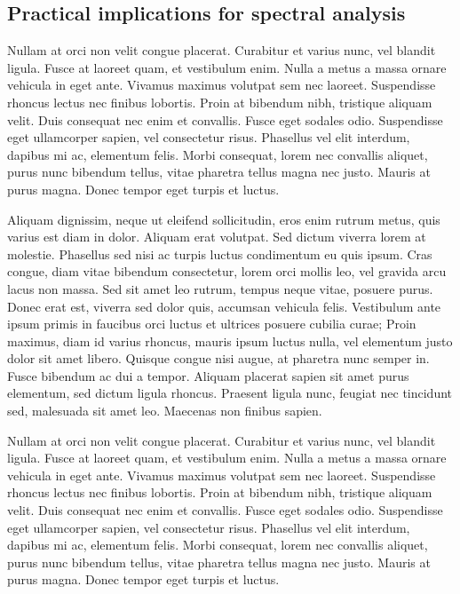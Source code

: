 \subsection{Practical implications for spectral analysis}
 Nullam at orci non velit congue placerat. Curabitur et varius nunc, vel blandit ligula. Fusce at laoreet quam, et vestibulum enim. Nulla a metus a massa ornare vehicula in eget ante. Vivamus maximus volutpat sem nec laoreet. Suspendisse rhoncus lectus nec finibus lobortis. Proin at bibendum nibh, tristique aliquam velit. Duis consequat nec enim et convallis. Fusce eget sodales odio. Suspendisse eget ullamcorper sapien, vel consectetur risus. Phasellus vel elit interdum, dapibus mi ac, elementum felis. Morbi consequat, lorem nec convallis aliquet, purus nunc bibendum tellus, vitae pharetra tellus magna nec justo. Mauris at purus magna. Donec tempor eget turpis et luctus.

Aliquam dignissim, neque ut eleifend sollicitudin, eros enim rutrum metus, quis varius est diam in dolor. Aliquam erat volutpat. Sed dictum viverra lorem at molestie. Phasellus sed nisi ac turpis luctus condimentum eu quis ipsum. Cras congue, diam vitae bibendum consectetur, lorem orci mollis leo, vel gravida arcu lacus non massa. Sed sit amet leo rutrum, tempus neque vitae, posuere purus. Donec erat est, viverra sed dolor quis, accumsan vehicula felis. Vestibulum ante ipsum primis in faucibus orci luctus et ultrices posuere cubilia curae; Proin maximus, diam id varius rhoncus, mauris ipsum luctus nulla, vel elementum justo dolor sit amet libero. Quisque congue nisi augue, at pharetra nunc semper in. Fusce bibendum ac dui a tempor. Aliquam placerat sapien sit amet purus elementum, sed dictum ligula rhoncus. Praesent ligula nunc, feugiat nec tincidunt sed, malesuada sit amet leo. Maecenas non finibus sapien.

Nullam at orci non velit congue placerat. Curabitur et varius nunc, vel blandit ligula. Fusce at laoreet quam, et vestibulum enim. Nulla a metus a massa ornare vehicula in eget ante. Vivamus maximus volutpat sem nec laoreet. Suspendisse rhoncus lectus nec finibus lobortis. Proin at bibendum nibh, tristique aliquam velit. Duis consequat nec enim et convallis. Fusce eget sodales odio. Suspendisse eget ullamcorper sapien, vel consectetur risus. Phasellus vel elit interdum, dapibus mi ac, elementum felis. Morbi consequat, lorem nec convallis aliquet, purus nunc bibendum tellus, vitae pharetra tellus magna nec justo. Mauris at purus magna. Donec tempor eget turpis et luctus.

